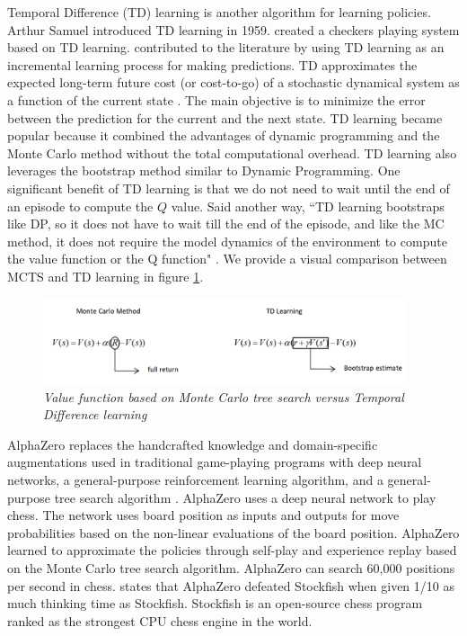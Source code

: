 \documentclass[12pt]{turabian-researchpaper}
\begin{document}
Temporal Difference (TD) learning is another algorithm for learning policies. Arthur Samuel introduced TD learning in 1959. \Textcite{samuel1959} created a checkers playing system based on TD learning. \Textcite{sutton1988learning} contributed to the literature by using TD learning as an incremental learning process for making predictions. TD approximates the expected long-term future cost (or cost-to-go) of a stochastic dynamical system as a function of the current state \parencite{baxter_learning_2000}. The main objective is to minimize the error between the prediction for the current and the next state. TD learning became popular because it combined the advantages of dynamic programming and the Monte Carlo method without the total computational overhead. TD learning also leverages the bootstrap method similar to Dynamic Programming. One significant benefit of TD learning is that we do not need to wait until the end of an episode to compute the \(Q\) value. Said another way, ``TD learning bootstraps like DP, so it does not have to wait till the end of the episode, and like the MC method, it does not require the model dynamics of the environment to compute the value function or the Q function" \parencite{science_understanding_2021}. We provide a visual comparison between MCTS and TD learning in figure \ref{fig:td_mc}. 

\begin{figure}[!ht]
    \centering
    \includegraphics[width=0.95\textwidth]{mcts_td.png}
    \caption{\textit{ Value function based on Monte Carlo tree search versus Temporal Difference learning}}
    \label{fig:td_mc}
\end{figure}

AlphaZero replaces the handcrafted knowledge and domain-specific augmentations used in traditional game-playing programs with deep neural networks, a general-purpose reinforcement learning algorithm, and a general-purpose tree search algorithm \parencite{silver_general_2018}. AlphaZero uses a deep neural network to play chess. The network uses board position as inputs and outputs for move probabilities based on the non-linear evaluations of the board position. AlphaZero learned to approximate the policies through self-play and experience replay based on the Monte Carlo tree search algorithm. AlphaZero can search 60,000 positions per second in chess. \Textcite{silver_general_2018} states that AlphaZero defeated Stockfish when given 1/10 as much thinking time as Stockfish. Stockfish is an open-source chess program ranked as the strongest CPU chess engine in the world. 
\end{document}

